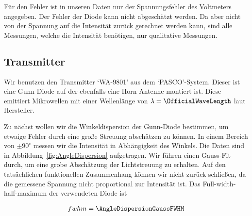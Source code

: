\documentclass[a4paper,10pt,twocolumn]{article}
\begin{document}
    Für den Fehler ist in unseren Daten nur der Spannungsfehler des Voltmeters angegeben.
    Der Fehler der Diode kann nicht abgeschätzt werden.
    Da aber nicht von der Spannung auf die Intensität zurück gerechnet werden kann, sind alle 
    Messungen, welche die Intensität benötigen, nur qualitative Messungen.
    
    \subsection{Transmitter}

    


    Wir benutzen den Transmitter `WA-9801' aus dem `PASCO'-System.
    Dieser ist eine Gunn-Diode auf der ebenfalls eine Horn-Antenne montiert ist.
    Diese emittiert Mikrowellen mit einer Wellenlänge von $\lambda = \OfficialWaveLength$ laut Hersteller.
    
    Zu nächst wollen wir die Winkeldispersion der Gunn-Diode bestimmen, um etwaige Fehler durch eine
    große Streuung abschätzen zu können.
    In einem Bereich von $\pm 90 ^{\circ}$ messen wir die Intensität in Abhängigkeit des Winkels.
    Die Daten sind in Abbildung~\ref{fig:AngleDispersion} aufgetragen.
    Wir führen einen Gauss-Fit durch, um eine grobe Abschätzung der Lichtstreuung zu erhalten.
    Auf den tatsächlichen funktionellen Zusammenhang können wir nicht zurück schließen, da die gemessene Spannung
    nicht proportional zur Intensität ist.
    Das Full-width-half-maximum der verwendeten Diode ist
    
    \begin{align*}
        fwhm = \AngleDispersionGaussFWHM
    \end{align*}
    
\end{document}
